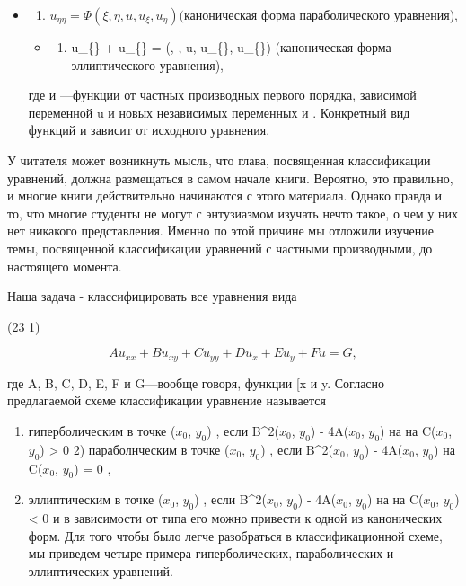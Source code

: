 \documentclass[
  ukrainian,
]{article}
\providecommand{\tightlist}{%
  \setlength{\itemsep}{0pt}\setlength{\parskip}{0pt}}
\begin{document}
\begin{itemize}
\item
  \begin{enumerate}
  \def\labelenumi{\arabic{enumi}.}
  \setcounter{enumi}{1}
  \tightlist
  \item
    \(u_{\eta\eta} = \Phi(\xi, \eta, u, u_{\xi}, u_{\eta}) (\)каноническая
    форма параболического уравнения),
  \end{enumerate}

  \begin{itemize}
  \tightlist
  \item
    \begin{enumerate}
    \def\labelenumi{\arabic{enumi}.}
    \setcounter{enumi}{2}
    \tightlist
    \item
      u\_\{\xi\xi\} + u\_\{\eta\eta\} = \Phi(\xi, \eta, u, u\_\{\xi\},
      u\_\{\eta\}) (каноническая форма эллиптического уравнения),
    \end{enumerate}
  \end{itemize}

  где \Phi   и \Psi  ---функции от частных производных первого порядка,
  зависимой переменной u и новых независимых переменных \xi   и \eta  .
  Конкретный вид функций \Phi   и \Psi   зависит от исходного уравнения.
\end{itemize}

У читателя может возникнуть мысль, что глава, посвященная классификации
уравнений, должна размещаться в самом начале книги. Вероятно, это
правильно, и многие книги действительно начинаются с этого материала.
Однако правда и то, что многие студенты не могут с энтузиазмом изучать
нечто такое, о чем у них нет никакого представления. Именно по этой
причине мы отложили изучение темы, посвященной классификации уравнений с
частными производными, до настоящего момента.

Наша задача - классифицировать все уравнения вида

(23 1)

\[
Au_{xx} + Bu_{xy} + Cu_{yy} + Du_x + Eu_y + Fu = G,
\]

где A, B, C, D, E, F и G---вообще говоря, функции {[}x и y. Согласно
предлагаемой схеме классификации уравнение называется

\begin{enumerate}
\def\labelenumi{\arabic{enumi})}
\item
  гиперболическим в точке (\(x_0\), \(y_0\)) , если B\^{}2(\(x_0\),
  \(y_0\)) - 4A(\(x_0\), \(y_0\))  на  на C(\(x_0\),
  \(y_0\)) \textgreater{} 0 2) параболнческим в точке (\(x_0\), \(y_0\))
  , если B\^{}2(\(x_0\), \(y_0\)) - 4A(\(x_0\), \(y_0\))  на
  C(\(x_0\), \(y_0\)) = 0 ,
\item
  эллиптическим в точке (\(x_0\), \(y_0\)) , если B\^{}2(\(x_0\),
  \(y_0\)) - 4A(\(x_0\), \(y_0\))  на  на C(\(x_0\),
  \(y_0\)) \textless{} 0 и в зависимости от типа его можно привести к
  одной из канонических форм. Для того чтобы было легче разобраться в
  классификационной схеме, мы приведем четыре примера гиперболических,
  параболических и эллиптических уравнений.
\end{enumerate}
\end{document}
